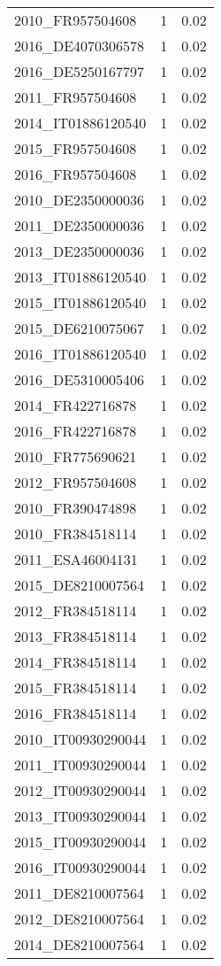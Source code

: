 \begin{table*}[htbp]
\begin{tabular}{lrr}
2010_FR957504608 & 1 & 0.02 \\
2016_DE4070306578 & 1 & 0.02 \\
2016_DE5250167797 & 1 & 0.02 \\
2011_FR957504608 & 1 & 0.02 \\
2014_IT01886120540 & 1 & 0.02 \\
2015_FR957504608 & 1 & 0.02 \\
2016_FR957504608 & 1 & 0.02 \\
2010_DE2350000036 & 1 & 0.02 \\
2011_DE2350000036 & 1 & 0.02 \\
2013_DE2350000036 & 1 & 0.02 \\
2013_IT01886120540 & 1 & 0.02 \\
2015_IT01886120540 & 1 & 0.02 \\
2015_DE6210075067 & 1 & 0.02 \\
2016_IT01886120540 & 1 & 0.02 \\
2016_DE5310005406 & 1 & 0.02 \\
2014_FR422716878 & 1 & 0.02 \\
2016_FR422716878 & 1 & 0.02 \\
2010_FR775690621 & 1 & 0.02 \\
2012_FR957504608 & 1 & 0.02 \\
2010_FR390474898 & 1 & 0.02 \\
2010_FR384518114 & 1 & 0.02 \\
2011_ESA46004131 & 1 & 0.02 \\
2015_DE8210007564 & 1 & 0.02 \\
2012_FR384518114 & 1 & 0.02 \\
2013_FR384518114 & 1 & 0.02 \\
2014_FR384518114 & 1 & 0.02 \\
2015_FR384518114 & 1 & 0.02 \\
2016_FR384518114 & 1 & 0.02 \\
2010_IT00930290044 & 1 & 0.02 \\
2011_IT00930290044 & 1 & 0.02 \\
2012_IT00930290044 & 1 & 0.02 \\
2013_IT00930290044 & 1 & 0.02 \\
2015_IT00930290044 & 1 & 0.02 \\
2016_IT00930290044 & 1 & 0.02 \\
2011_DE8210007564 & 1 & 0.02 \\
2012_DE8210007564 & 1 & 0.02 \\
2014_DE8210007564 & 1 & 0.02 \\

\end{tabular}
\end{table*}
